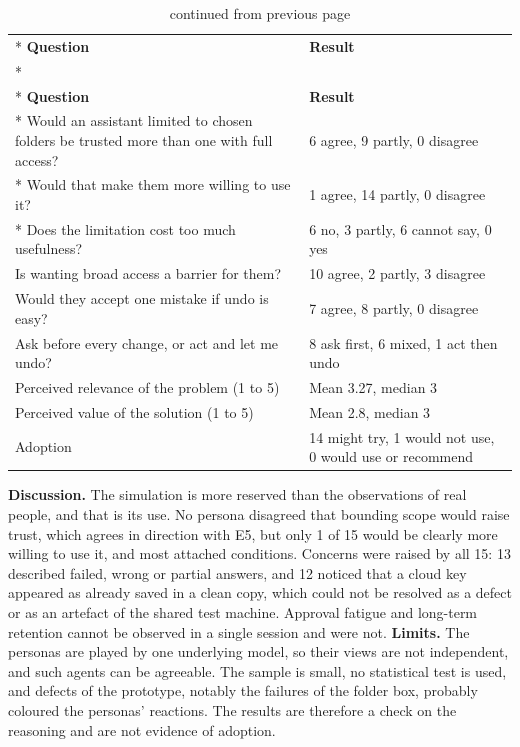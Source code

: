 \documentclass{FastFyp}
\begin{document}
{
\begin{longtable}{|p{8.0cm}|p{5.2cm}|}
\caption{Persona simulation results.}\label{tab:sim}\\*
\hline
\textbf{Question} & \textbf{Result} \\*
\hline
\endfirsthead
\caption[]{continued from previous page}\\*
\hline
\textbf{Question} & \textbf{Result} \\*
\hline
\endhead
\hline
Would an assistant limited to chosen folders be trusted more than one with full access? & 6 agree, 9 partly, 0 disagree \\*
\hline
Would that make them more willing to use it? & 1 agree, 14 partly, 0 disagree \\*
\hline
Does the limitation cost too much usefulness? & 6 no, 3 partly, 6 cannot say, 0 yes \\
\hline
Is wanting broad access a barrier for them? & 10 agree, 2 partly, 3 disagree \\
\hline
Would they accept one mistake if undo is easy? & 7 agree, 8 partly, 0 disagree \\
\hline
Ask before every change, or act and let me undo? & 8 ask first, 6 mixed, 1 act then undo \\
\hline
Perceived relevance of the problem (1 to 5) & Mean 3.27, median 3 \\
\hline
Perceived value of the solution (1 to 5) & Mean 2.8, median 3 \\
\hline
Adoption & 14 might try, 1 would not use, 0 would use or recommend \\
\hline
\end{longtable}
}

\textbf{Discussion.} The simulation is more reserved than the observations of real people, and that is its use. No persona disagreed that bounding scope would raise trust, which agrees in direction with E5, but only 1 of 15 would be clearly more willing to use it, and most attached conditions. Concerns were raised by all 15: 13 described failed, wrong or partial answers, and 12 noticed that a cloud key appeared as already saved in a clean copy, which could not be resolved as a defect or as an artefact of the shared test machine. Approval fatigue and long-term retention cannot be observed in a single session and were not. \textbf{Limits.} The personas are played by one underlying model, so their views are not independent, and such agents can be agreeable. The sample is small, no statistical test is used, and defects of the prototype, notably the failures of the folder box, probably coloured the personas' reactions. The results are therefore a check on the reasoning and are not evidence of adoption.
\end{document}
